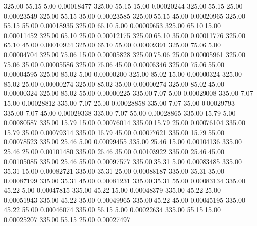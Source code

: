     325.00     55.15      5.00     0.00018477
    325.00     55.15     15.00     0.00020244
    325.00     55.15     25.00     0.00023549
    325.00     55.15     35.00     0.00023585
    325.00     55.15     45.00     0.00020965
    325.00     55.15     55.00     0.00018935
    325.00     65.10      5.00     0.00009653
    325.00     65.10     15.00     0.00011452
    325.00     65.10     25.00     0.00012175
    325.00     65.10     35.00     0.00011776
    325.00     65.10     45.00     0.00010924
    325.00     65.10     55.00     0.00009391
    325.00     75.06      5.00     0.00004704
    325.00     75.06     15.00     0.00005828
    325.00     75.06     25.00     0.00005961
    325.00     75.06     35.00     0.00005586
    325.00     75.06     45.00     0.00005346
    325.00     75.06     55.00     0.00004595
    325.00     85.02      5.00     0.00000200
    325.00     85.02     15.00     0.00000324
    325.00     85.02     25.00     0.00000274
    325.00     85.02     35.00     0.00000274
    325.00     85.02     45.00     0.00000324
    325.00     85.02     55.00     0.00000225
    335.00      7.07      5.00     0.00029008
    335.00      7.07     15.00     0.00028812
    335.00      7.07     25.00     0.00028858
    335.00      7.07     35.00     0.00029793
    335.00      7.07     45.00     0.00029338
    335.00      7.07     55.00     0.00028865
    335.00     15.79      5.00     0.00080587
    335.00     15.79     15.00     0.00076014
    335.00     15.79     25.00     0.00076104
    335.00     15.79     35.00     0.00079314
    335.00     15.79     45.00     0.00077621
    335.00     15.79     55.00     0.00078523
    335.00     25.46      5.00     0.00099455
    335.00     25.46     15.00     0.00104136
    335.00     25.46     25.00     0.00101480
    335.00     25.46     35.00     0.00103922
    335.00     25.46     45.00     0.00105085
    335.00     25.46     55.00     0.00097577
    335.00     35.31      5.00     0.00083485
    335.00     35.31     15.00     0.00082721
    335.00     35.31     25.00     0.00088187
    335.00     35.31     35.00     0.00087199
    335.00     35.31     45.00     0.00081231
    335.00     35.31     55.00     0.00083134
    335.00     45.22      5.00     0.00047815
    335.00     45.22     15.00     0.00048379
    335.00     45.22     25.00     0.00051943
    335.00     45.22     35.00     0.00049965
    335.00     45.22     45.00     0.00045195
    335.00     45.22     55.00     0.00046074
    335.00     55.15      5.00     0.00022634
    335.00     55.15     15.00     0.00025207
    335.00     55.15     25.00     0.00027497
